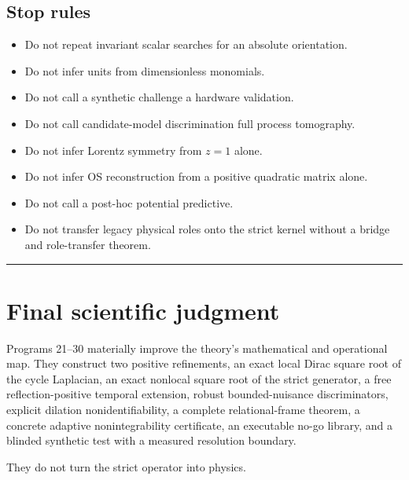 \documentclass[11pt,a4paper,openany]{report}
\begin{document}
\section{Stop rules}

\begin{itemize}
\item 
Do not repeat invariant scalar searches for an absolute orientation.

\item 
Do not infer units from dimensionless monomials.

\item 
Do not call a synthetic challenge a hardware validation.

\item 
Do not call candidate-model discrimination full process tomography.

\item 
Do not infer Lorentz symmetry from \(z=1\) alone.

\item 
Do not infer OS reconstruction from a positive quadratic matrix alone.

\item 
Do not call a post-hoc potential predictive.

\item 
Do not transfer legacy physical roles onto the strict kernel without a bridge and role-transfer theorem.

\end{itemize}

\par\medskip\hrule\medskip

\chapter{Final scientific judgment}

Programs 21–30 materially improve the theory's mathematical and operational map. They construct two positive refinements, an exact local Dirac square root of the cycle Laplacian, an exact nonlocal square root of the strict generator, a free reflection-positive temporal extension, robust bounded-nuisance discriminators, explicit dilation nonidentifiability, a complete relational-frame theorem, a concrete adaptive nonintegrability certificate, an executable no-go library, and a blinded synthetic test with a measured resolution boundary.

They do not turn the strict operator into physics.
\end{document}
